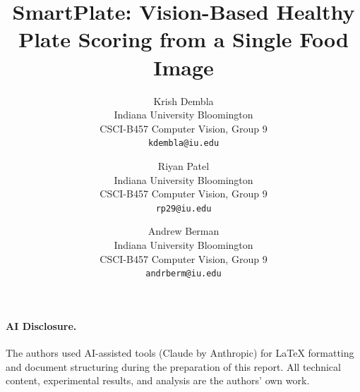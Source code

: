 \documentclass[10pt,twocolumn,letterpaper]{article}
\title{SmartPlate: Vision-Based Healthy Plate Scoring from a Single Food Image}
\author{Krish Dembla\\
Indiana University Bloomington\\
CSCI-B457 Computer Vision, Group 9\\
{\tt\small kdembla@iu.edu}
\and
Riyan Patel\\
Indiana University Bloomington\\
CSCI-B457 Computer Vision, Group 9\\
{\tt\small rp29@iu.edu}
\and
Andrew Berman\\
Indiana University Bloomington\\
CSCI-B457 Computer Vision, Group 9\\
{\tt\small andrberm@iu.edu}
}
\begin{document}
\maketitle
    





{\small\paragraph{AI Disclosure.}
The authors used AI-assisted tools (Claude by Anthropic) for LaTeX formatting and document structuring during the preparation of this report.
All technical content, experimental results, and analysis are the authors' own work.}

{
    \small
    
    
}
\end{document}
